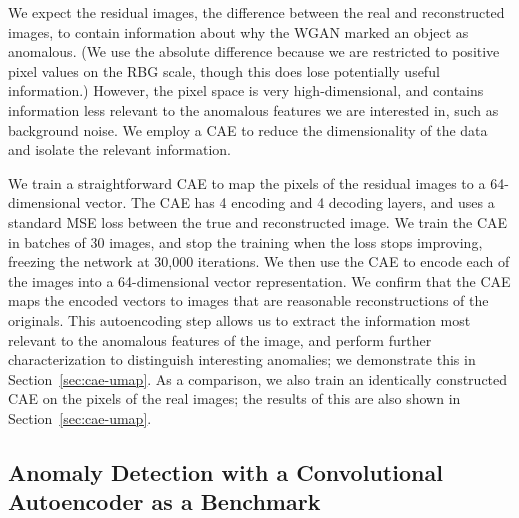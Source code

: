 We expect the residual images, the difference between the real and reconstructed images, to contain information about why the WGAN marked an object as anomalous.
(We use the absolute difference because we are restricted to positive pixel values on the RBG scale, though this does lose potentially useful information.)
However, the pixel space is very high-dimensional, and contains information less relevant to the anomalous features we are interested in, such as background noise.
We employ a CAE to reduce the dimensionality of the data and isolate the relevant information.

We train a straightforward CAE to map the pixels of the residual images to a 64-dimensional vector.
The CAE has 4 encoding and 4 decoding layers, and uses a standard MSE loss between the true and reconstructed image.
We train the CAE in batches of 30 images, and stop the training when the loss stops improving, freezing the network at 30,000 iterations.
We then use the CAE to encode each of the images into a 64-dimensional vector representation.
We confirm that the CAE maps the encoded vectors to images that are reasonable reconstructions of the originals.
This autoencoding step allows us to extract the information most relevant to the anomalous features of the image, and perform further characterization to distinguish interesting anomalies; we demonstrate this in Section~\ref{sec:cae-umap}.
As a comparison, we also train an identically constructed CAE on the pixels of the real images; the results of this are also shown in Section~\ref{sec:cae-umap}.

\subsection{Anomaly Detection with a Convolutional Autoencoder as a Benchmark}
\label{sec:cae_bench}


